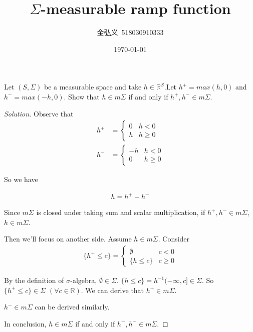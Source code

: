 \documentclass[a4paper, linespread=1.5]{article}
\begin{document}
    \title{ $\Sigma$-measurable ramp function}
    \author{金弘义\ 518030910333}
    \date{\today}
    \maketitle
    
    \begin{customex}{9}
    	Let $(S,\Sigma)$ be a measurable space and take $h\in \mathbb{R}^{S} $.Let $h^{+}=max(h,0)$ and $h^{-}=max(-h,0)$. Show that $h\in m\Sigma$ if and only if $h^{+},h^{-}\in m\Sigma$.
        
    \end{customex}
	\begin{proof}[Solution]
		
		Observe that \begin{align*}
			h^{+}&=\begin{cases}
			0&h<0 \\
			h&h\ge 0
			\end{cases}\\
			h^{-}&=\begin{cases}
			-h& h<0\\
			0 & h\ge 0
			\end{cases}
		\end{align*}
		
		So we have
		 
		\begin{align*}
		h=h^{+}-h^{-}
		\end{align*}
		
		Since $m\Sigma$ is closed under taking sum and scalar multiplication, if $h^{+},h^{-}\in m\Sigma$, $h\in m\Sigma$. 
		
		Then we'll focus on another side. Assume $h\in m\Sigma$. Consider
		\begin{align*}
			\{h^{+}\le c\}=\begin{cases}
			\emptyset & c<0 \\
			\{h\le c\} & c\ge 0
			\end{cases}
		\end{align*}
		
		By the definition of $\sigma$-algebra, $\emptyset \in \Sigma$. $\{h\le c\}=h^{-1}(-\infty,c] \in \Sigma$. So $\{h^{+}\le c\}\in \Sigma$ $(\forall c\in \mathbb{R})$. We can derive that $h^{+}\in m\Sigma$.
		
		 $h^{-} \in m\Sigma$ can be derived similarly.
		
		In conclusion, $h\in m\Sigma$ if and only if $h^{+},h^{-}\in m\Sigma$.
	\end{proof}
	
	
    
    
\end{document}
